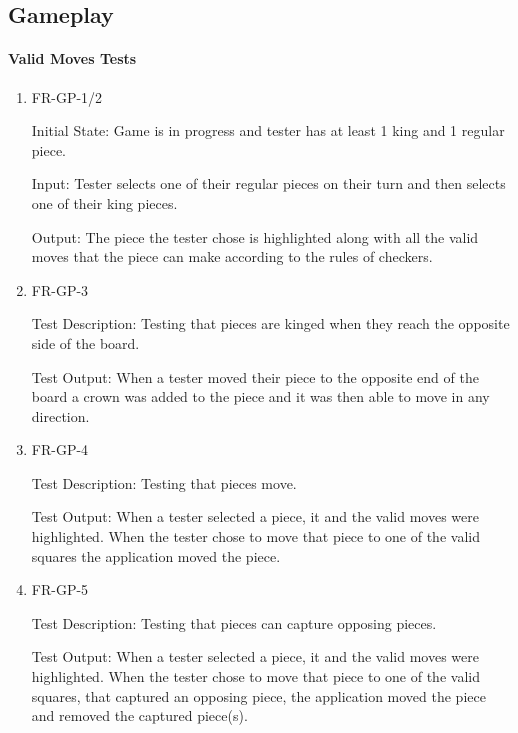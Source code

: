 \documentclass[12pt, titlepage]{article}
\begin{document}
\subsection{Gameplay}

\paragraph{Valid Moves Tests}
\begin{enumerate}
    \item{FR-GP-1/2}
                    
    Initial State: Game is in progress and tester has at least 1 king and 1 regular piece.
    
    Input: Tester selects one of their regular pieces on their turn and then selects one of their king pieces.
    
    Output: The piece the tester chose is highlighted along with all the valid moves that the piece can make according to the rules of checkers.
    \item{FR-GP-3}
    
    Test Description: Testing that pieces are kinged when they reach the opposite side of the board.
    
    Test Output: When a tester moved their piece to the opposite end of the board a crown was added to the piece and it was then able to move in any direction. 
    \item{FR-GP-4}
    
    Test Description: Testing that pieces move.
    
    Test Output: When a tester selected a piece, it and the valid moves were highlighted. When the tester chose to move that piece to one of the valid squares the application moved the piece. 
    \item{FR-GP-5}
    
    Test Description: Testing that pieces can capture opposing pieces.
    
    Test Output: When a tester selected a piece, it and the valid moves were highlighted. When the tester chose to move that piece to one of the valid squares, that captured an opposing piece, the application moved the piece and removed the captured piece(s).
\end{enumerate}
\end{document}
